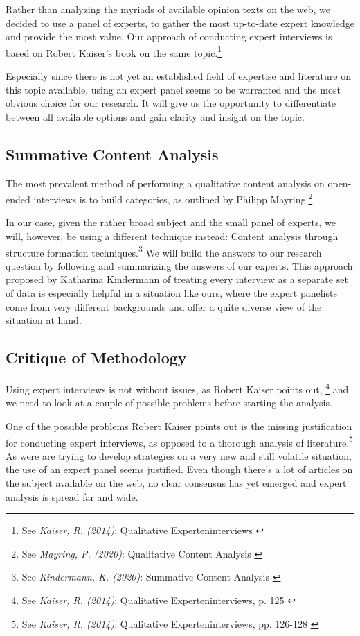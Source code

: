 Rather than analyzing the myriads of available opinion texts on the web, we decided to use a panel of experts, to gather the most up-to-date expert knowledge and provide the most value. Our approach of conducting expert interviews is based on Robert Kaiser's book on the same topic.\footnote{See \textit{Kaiser, R. (2014)}: Qualitative Experteninterviews \cite{expertInterviews}}

Especially since there is not yet an established field of expertise and literature on this topic available, using an expert panel seems to be warranted and the most obvious choice for our research. It will give us the opportunity to differentiate between all available options and gain clarity and insight on the topic.

\subsection{Summative Content Analysis} 

The most prevalent method of performing a qualitative content analysis on open-ended interviews is to build categories, as outlined by Philipp Mayring.\footnote{See \textit{Mayring, P. (2020)}: Qualitative Content Analysis \cite{qualiContent}}

In our case, given the rather broad subject and the small panel of experts, we will, however, be using a different technique instead: Content analysis through structure formation techniques.\footnote{See \textit{Kindermann, K. (2020)}: Summative Content Analysis \cite{summaContent}} We will build the answers to our research question by following and summarizing the answers of our experts. This approach proposed by Katharina Kindermann of treating every interview as a separate set of data is especially helpful in a situation like ours, where the expert panelists come from very different backgrounds and offer a quite diverse view of the situation at hand.

\subsection{Critique of Methodology}

Using expert interviews is not without issues, as Robert Kaiser points out, \footnote{See \textit{Kaiser, R. (2014)}: Qualitative Experteninterviews, p. 125 \cite{expertInterviews}} and we need to look at a couple of possible problems before starting the analysis.

One of the possible problems Robert Kaiser points out is the missing justification for conducting expert interviews, as opposed to a thorough analysis of literature.\footnote{See \textit{Kaiser, R. (2014)}: Qualitative Experteninterviews, pp. 126-128 \cite{expertInterviews}} As were are trying to develop strategies on a very new and still volatile situation, the use of an expert panel seems justified. Even though there's a lot of articles on the subject available on the web, no clear consensus has yet emerged and expert analysis is spread far and wide.

